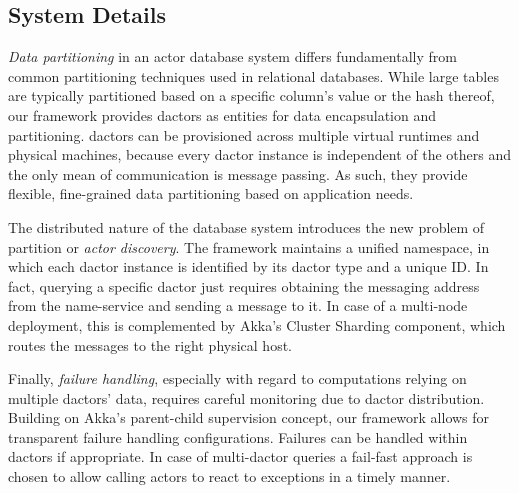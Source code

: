     \subsection{System Details}\label{subsec:framework_discussion}
      \emph{Data partitioning} in an actor database system differs fundamentally from common partitioning techniques used in relational databases.
      While large tables are typically partitioned based on a specific column's value or the hash thereof, our framework provides \glspl{dactor} as entities for data encapsulation and partitioning.
      \Glspl{dactor} can be provisioned across multiple virtual runtimes and physical machines, because every \gls{dactor} instance is independent of the others and the only mean of communication is message passing.
      As such, they provide flexible, fine-grained data partitioning based on application needs.
      
      The distributed nature of the database system introduces the new problem of partition or \emph{actor discovery}.
      The framework maintains a unified namespace, in which each \gls{dactor} instance is identified by its \gls{dactor} type and a unique ID.
      In fact, querying a specific \gls{dactor} just requires obtaining the messaging address from the name-service and sending a message to it.
      In case of a multi-node deployment, this is complemented by Akka's Cluster Sharding component, which routes the messages to the right physical host.
      
      Finally, \emph{failure handling}, especially with regard to computations relying on multiple \glspl{dactor}' data, requires careful monitoring due to \gls{dactor} distribution.
      Building on Akka's parent-child supervision concept, our framework allows for transparent failure handling configurations.
      Failures can be handled within \glspl{dactor} if appropriate.
      In case of multi-\gls{dactor} queries a fail-fast approach is chosen to allow calling actors to react to exceptions in a timely manner.